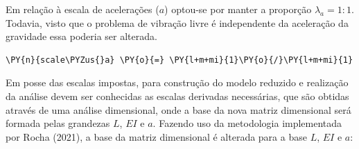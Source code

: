     
    Em relação à escala de acelerações (\(a\)) optou-se por manter a
proporção \(\lambda_a=1:1\). Todavia, visto que o problema de vibração
livre é independente da aceleração da gravidade essa poderia ser
alterada.

    \begin{tcolorbox}[breakable, size=fbox, boxrule=1pt, pad at break*=1mm,colback=cellbackground, colframe=cellborder]
\begin{Verbatim}[commandchars=\\\{\}]
\PY{n}{scale\PYZus{}a} \PY{o}{=} \PY{l+m+mi}{1}\PY{o}{/}\PY{l+m+mi}{1}
\end{Verbatim}
\end{tcolorbox}

    Em posse das escalas impostas, para construção do modelo reduzido e
realização da análise devem ser conhecidas as escalas derivadas
necessárias, que são obtidas através de uma análise dimensional, onde a
base da nova matriz dimensional será formada pelas grandezas \(L\),
\(EI\) e \(a\). Fazendo uso da metodologia implementada por Rocha
(2021), a base da matriz dimensional é alterada para a base \(L\),
\(EI\) e \(a\):

